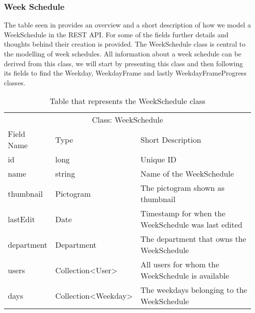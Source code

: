 \subsubsection{Week Schedule}
The table seen in  provides an overview and a short description of how we model a WeekSchedule in the REST API.
For some of the fields further details and thoughts behind their creation is provided.
The WeekSchedule class is central to the modelling of week schedules.
All information about a week schedule can be derived from this class, we will start by presenting this class and then following its fields to find the Weekday, WeekdayFrame and lastly WeekdayFrameProgress classes.

\begin{table}[]
\centering
\caption{Table that represents the WeekSchedule class}
\label{tbl:WeekSchedule}
\begin{tabular}{lll}
\multicolumn{3}{c}{Class: WeekSchedule}                                                                      \\
Field Name & Type                                    & Short Description                                     \\
id         & long                                    & Unique ID                                             \\
name       & string                                  & Name of the WeekSchedule                              \\
thumbnail  & Pictogram                               & The pictogram shown as thumbnail                      \\
lastEdit   & Date                                    & Timestamp for when the WeekSchedule was last edited   \\
department & Department                              & The department that owns the WeekSchedule             \\
users      & Collection\textless User\textgreater    & All users for whom the WeekSchedule is available      \\
days       & Collection\textless Weekday\textgreater & The weekdays belonging to the WeekSchedule           
\end{tabular}
\end{table}

